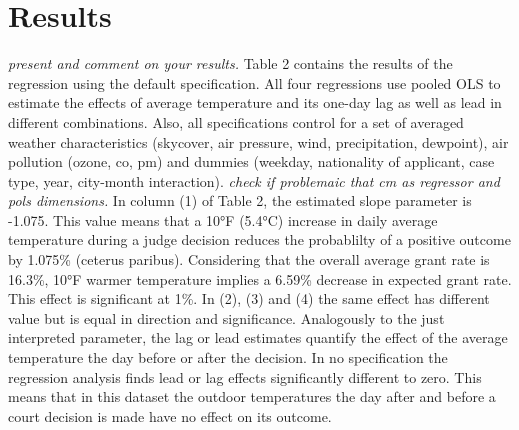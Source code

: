 \documentclass[11pt]{article}
\begin{document}
	\section{Results}
	\textit{present and comment on your results.} \newline
	Table 2 contains the results of the regression using the default specification. All four regressions use pooled OLS to estimate the effects of average temperature and its one-day lag as well as lead in different combinations. Also, all specifications control for a set of averaged weather characteristics (skycover, air pressure, wind, precipitation, dewpoint), air pollution (ozone, co, pm) and dummies (weekday, nationality of applicant, case type, year, city-month interaction). \textit{check if problemaic that cm as regressor and pols dimensions.}
	In column (1) of Table 2, the estimated slope parameter is -1.075. This value means that a 10°F (5.4°C) increase in daily average temperature during a judge decision reduces the probablilty of a positive outcome by 1.075\% (ceterus paribus). Considering that the overall average grant rate is 16.3\%, 10°F warmer temperature implies a 6.59\% decrease in expected grant rate. This effect is significant at 1\%. In (2), (3) and (4) the same effect has different value but is equal in direction and significance. Analogously to the just interpreted parameter, the lag or lead estimates quantify the effect of the average temperature the day before or after the decision. In no specification the regression analysis finds lead or lag effects significantly different to zero. This means that in this dataset the outdoor temperatures the day after and before a court decision is made have no effect on its outcome. 	
	
\end{document}
